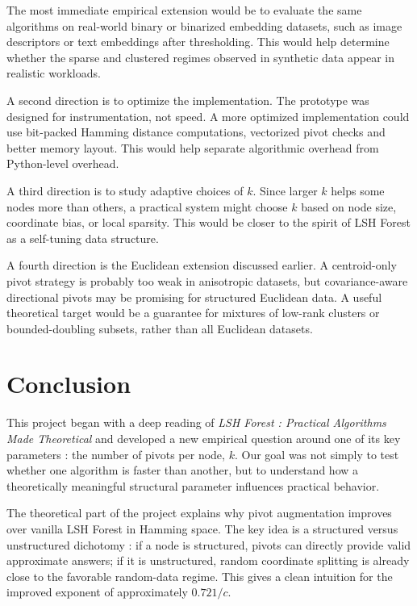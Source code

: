 \documentclass[11pt]{article}
\begin{document}
The most immediate empirical extension would be to evaluate the same algorithms on real-world binary or binarized embedding datasets, such as image descriptors or text embeddings after thresholding. This would help determine whether the sparse and clustered regimes observed in synthetic data appear in realistic workloads.

A second direction is to optimize the implementation. The prototype was designed for instrumentation, not speed. A more optimized implementation could use bit-packed Hamming distance computations, vectorized pivot checks and better memory layout. This would help separate algorithmic overhead from Python-level overhead.

A third direction is to study adaptive choices of $k$. Since larger $k$ helps some nodes more than others, a practical system might choose $k$ based on node size, coordinate bias, or local sparsity. This would be closer to the spirit of LSH Forest as a self-tuning data structure.

A fourth direction is the Euclidean extension discussed earlier. A centroid-only pivot strategy is probably too weak in anisotropic datasets, but covariance-aware directional pivots may be promising for structured Euclidean data. A useful theoretical target would be a guarantee for mixtures of low-rank clusters or bounded-doubling subsets, rather than all Euclidean datasets.

\section{Conclusion}

This project began with a deep reading of \emph{LSH Forest : Practical Algorithms Made Theoretical} and developed a new empirical question around one of its key parameters : the number of pivots per node, $k$. Our goal was not simply to test whether one algorithm is faster than another, but to understand how a theoretically meaningful structural parameter influences practical behavior.

The theoretical part of the project explains why pivot augmentation improves over vanilla LSH Forest in Hamming space. The key idea is a structured versus unstructured dichotomy : if a node is structured, pivots can directly provide valid approximate answers; if it is unstructured, random coordinate splitting is already close to the favorable random-data regime. This gives a clean intuition for the improved exponent of approximately $0.721/c$.
\end{document}
